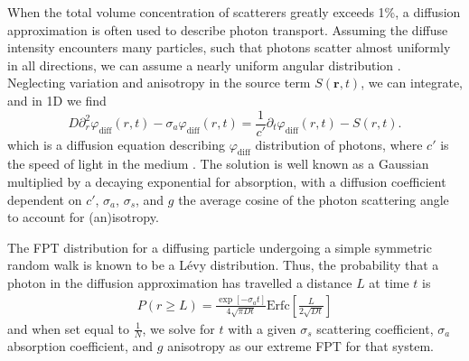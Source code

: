 \documentclass[9pt,twocolumn,twoside]{opticajnl}
\begin{document}
When the total volume concentration of scatterers greatly exceeds 1\%, a diffusion approximation is often used to describe photon transport. Assuming the diffuse intensity encounters many particles, such that photons scatter almost uniformly in all directions, we can assume a nearly uniform angular distribution \cite{ishimaru_wave_nodate,bohren_absorption_1983}. Neglecting variation and anisotropy in the source term $S\left(\mathbf{r},t\right)$, we can integrate, and in 1D we find
\begin{equation}
    D \partial_{r}^{2} \varphi_{\textrm{diff}} \left(r,t\right) - \sigma_{a} \varphi_{\textrm{diff}} \left(r,t\right) = \frac{1}{c'} \partial_{t} \varphi_{\textrm{diff}} \left(r,t\right) - S \left(r,t\right).
\end{equation}
which is a diffusion equation describing $\varphi_{\textrm{diff}}$ distribution of photons, where $c'$ is the speed of light in the medium \cite{haskell_boundary_1994}. The solution is well known as
a Gaussian multiplied by a decaying exponential for absorption, with a diffusion coefficient dependent on $c'$, $\sigma_{a}$, $\sigma_{s}$, and $g$ the average cosine of the photon scattering angle to account for (an)isotropy.

The FPT distribution for a diffusing particle undergoing a simple symmetric random walk is known to be a Lévy distribution. Thus, the probability that a photon in the diffusion approximation has travelled a distance $L$ at time $t$ is
\begin{align}
     P\left(r \geq L\right) = \frac{\exp\left[{-\sigma_{a} t}\right]}{4 \sqrt{\pi D t}}\textrm{Erfc}\left[{\frac{L}{2 \sqrt{D t}}}\right] \label{FPT_diff}
\end{align}
and when set equal to $\frac{1}{N}$, we solve for $t$ with a given $\sigma_{s}$ scattering coefficient, $\sigma_{a}$ absorption coefficient, and $g$ anisotropy as our extreme FPT for that system.
\end{document}

